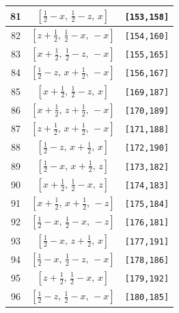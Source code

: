 \documentclass[fleqn,8pt]{jsarticle}
\begin{document}
\begin{longtable}{ccc}
81 & $\left[ \frac{1}{2} - x,\, \frac{1}{2} - z,\, x \right]$ & {\tt [153,158]} \\ \hline
82 & $\left[ z + \frac{1}{2},\, \frac{1}{2} - x,\, - x \right]$ & {\tt [154,160]} \\ \hline
83 & $\left[ x + \frac{1}{2},\, \frac{1}{2} - z,\, - x \right]$ & {\tt [155,165]} \\ \hline
84 & $\left[ \frac{1}{2} - z,\, x + \frac{1}{2},\, - x \right]$ & {\tt [156,167]} \\ \hline
85 & $\left[ x + \frac{1}{2},\, \frac{1}{2} - z,\, x \right]$ & {\tt [169,187]} \\ \hline
86 & $\left[ x + \frac{1}{2},\, z + \frac{1}{2},\, - x \right]$ & {\tt [170,189]} \\ \hline
87 & $\left[ z + \frac{1}{2},\, x + \frac{1}{2},\, - x \right]$ & {\tt [171,188]} \\ \hline
88 & $\left[ \frac{1}{2} - z,\, x + \frac{1}{2},\, x \right]$ & {\tt [172,190]} \\ \hline
89 & $\left[ \frac{1}{2} - x,\, x + \frac{1}{2},\, z \right]$ & {\tt [173,182]} \\ \hline
90 & $\left[ x + \frac{1}{2},\, \frac{1}{2} - x,\, z \right]$ & {\tt [174,183]} \\ \hline
91 & $\left[ x + \frac{1}{2},\, x + \frac{1}{2},\, - z \right]$ & {\tt [175,184]} \\ \hline
92 & $\left[ \frac{1}{2} - x,\, \frac{1}{2} - x,\, - z \right]$ & {\tt [176,181]} \\ \hline
93 & $\left[ \frac{1}{2} - x,\, z + \frac{1}{2},\, x \right]$ & {\tt [177,191]} \\ \hline
94 & $\left[ \frac{1}{2} - x,\, \frac{1}{2} - z,\, - x \right]$ & {\tt [178,186]} \\ \hline
95 & $\left[ z + \frac{1}{2},\, \frac{1}{2} - x,\, x \right]$ & {\tt [179,192]} \\ \hline
96 & $\left[ \frac{1}{2} - z,\, \frac{1}{2} - x,\, - x \right]$ & {\tt [180,185]} \\
\end{longtable}
\renewcommand{\arraystretch}{1.2}
\end{document}
